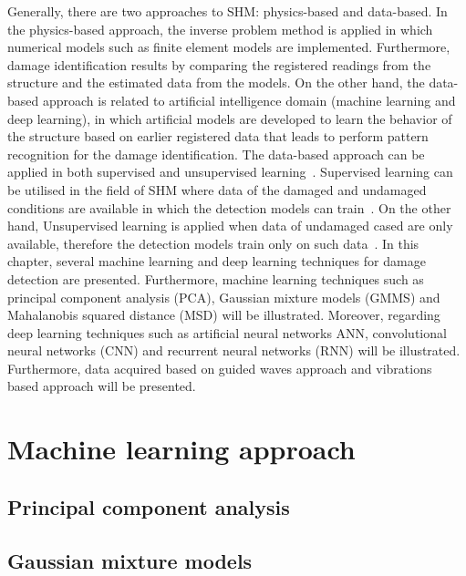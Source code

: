 \documentclass[b5paper, 11pt, openany, titlepage]{book}
\begin{document}
Generally, there are two approaches to SHM: physics-based and
data-based.
In the physics-based approach, the inverse problem method is applied in which numerical models such as finite element models are implemented. 
Furthermore, damage identification results by comparing the registered readings from the structure and the estimated data from the models.
On the other hand,  the data-based approach is related to artificial intelligence domain (machine learning and deep learning), in which artificial models are developed to learn the behavior of the structure based on earlier registered data that leads to perform pattern recognition for the damage identification.
The data-based approach can be applied in both supervised and unsupervised learning~\cite{worden2007application}.
Supervised learning can be utilised in the field of SHM where data of the damaged and undamaged conditions are available in which the detection models can train~\cite{figueiredo2018machine}.
On the other hand, Unsupervised learning is applied when data of undamaged cased are only available, therefore the detection models train only on such data~\cite{figueiredo2018machine}. 
In this chapter, several machine learning and deep learning techniques for damage detection are presented.
Furthermore, machine learning techniques such as principal component analysis (PCA), Gaussian mixture models (GMMS) and Mahalanobis squared distance (MSD) will be illustrated.
Moreover, regarding deep learning techniques such as artificial neural networks ANN, convolutional neural networks (CNN) and recurrent neural networks (RNN) will be illustrated.
Furthermore, data acquired based on guided waves approach and vibrations based approach will be presented.  
\section{Machine learning approach}
\subsection{Principal component analysis}
\subsection{Gaussian mixture models}
\end{document}
